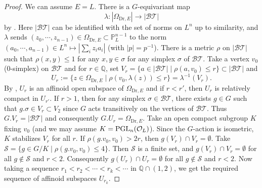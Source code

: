 \documentclass[a4paper,10pt]{amsart}
\theoremstyle{remark}
\theoremstyle{definition}
\theoremstyle{plain}
\numberwithin{equation}{section}
\newcommand{\bbP}{{\mathbb P}}
\newcommand{\bbQ}{{\mathbb Q}}
\newcommand{\calB}{{\mathcal B}}
\newcommand{\calO}{{\mathcal O}}
\newcommand{\calS}{{\mathcal S}}
\newcommand{\calT}{{\mathcal T}}
\newcommand{\PGL}{{\rm PGL}}
\begin{document}
\begin{proof}
	We can assume $E=L$. There is a $G$-equivariant map 
	\begin{equation}\label{equationresiduemapDrinfledspace}
		\lambda:|\Omega_{\mathrm{Dr},E}| \rightarrow  |\calB\calT|
	\end{equation}
	by \cite[\S~6, A)]{drinfeld1974elliptic}. Here $|\calB\calT|$ can be identified with the set of norms on $L^{n}$ up to similarity, and $\lambda$ sends $(z_0,\cdots,z_{n-1})\in \Omega_{\mathrm{Dr},E}\subset \bbP^{n-1}_{L}$ to the norm $(a_0,\cdots,a_{n-1})\in L^{n}\mapsto |\sum_i z_ia_i|$ (with $|p|=p^{-1}$). There is a metric $\rho$ on $|\calB\calT|$ such that $\rho(x,y)\leq 1$ for any $x,y\in\sigma$ for any simplex $\sigma$ of $\calB\calT$. Take a vertex $v_0$ ($0$-simplex) on $\calB\calT$ and for $r\in \bbQ$, set $V_r=\{a\in |\calB\calT|\mid \rho(a,v_0)\leq r \}\subset |\calB\calT|$ and 
	\[U_r:=\{z\in \Omega_{\mathrm{Dr},E}\mid \rho(v_0,\lambda(z))\leq r\}=\lambda^{-1}(V_r).\]
	By \cite[Prop.~6.1]{drinfeld1974elliptic}, $U_r$ is an affinoid open subspace of $\Omega_{\mathrm{Dr},E}$ and if $r<r'$, then $U_r$ is relatively compact in $ U_{r'}$. If $r>1$, then for any simplex $\sigma\in\calB\calT$, there exists $g\in G$ such that $g.\sigma\in V_r\subset V_2$ since $G$ acts transitively on the vertices of $\calB\calT$. Thus $G.V_r=|\calB\calT|$ and consequently $G.U_r=\Omega_{\mathrm{Dr},E}$. Take an open compact subgroup $K$ fixing $v_0$ (and we may assume $K=\PGL_n(\calO_L)$). Since the $G$-action is isometric, $K$ stabilizes $V_r$ for all $r$. If $\rho(g.v_0,v_0)>2r$, then $g(V_r)\cap V_r=\emptyset$. Take $\calS=\{g\in G/K\mid \rho(g.v_0,v_0)\leq 4\}$. Then $\calS$ is a finite set, and $g(V_r)\cap V_r=\emptyset$ for all $g\notin \calS$ and $r<2$. Consequently $g(U_r)\cap U_r=\emptyset$ for all $g\notin \calS$ and $r<2$. Now taking a sequence $r_1<r_2<\cdots <r_k<\cdots $ in  $\bbQ\cap (1,2)$, we get the required sequence of affinoid subspaces $U_{r_k}$.
\end{proof}
\end{document}
